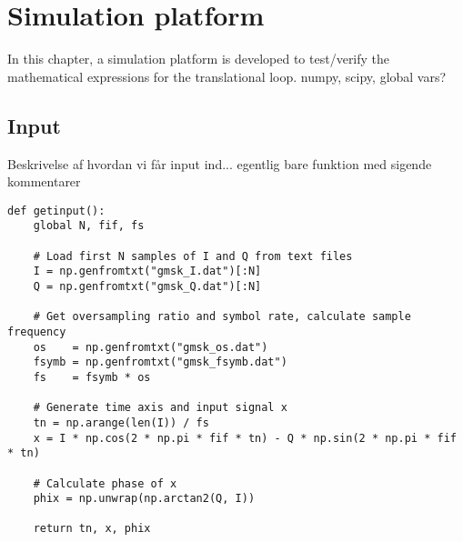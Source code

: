 

\chapter{Simulation platform} \label{ch:intro}
In this chapter, a simulation platform is developed to test/verify the mathematical expressions for the translational loop. numpy, scipy, global vars?

\section{Input}
Beskrivelse af hvordan vi får input ind... egentlig bare funktion med sigende kommentarer

\lstset{language=python,caption=pe,label=code:asdf}
\begin{lstlisting}
def getinput():
    global N, fif, fs

    # Load first N samples of I and Q from text files
    I = np.genfromtxt("gmsk_I.dat")[:N]
    Q = np.genfromtxt("gmsk_Q.dat")[:N]

    # Get oversampling ratio and symbol rate, calculate sample frequency
    os    = np.genfromtxt("gmsk_os.dat")
    fsymb = np.genfromtxt("gmsk_fsymb.dat")
    fs    = fsymb * os

    # Generate time axis and input signal x
    tn = np.arange(len(I)) / fs
    x = I * np.cos(2 * np.pi * fif * tn) - Q * np.sin(2 * np.pi * fif * tn)

    # Calculate phase of x
    phix = np.unwrap(np.arctan2(Q, I))

    return tn, x, phix
\end{lstlisting}



